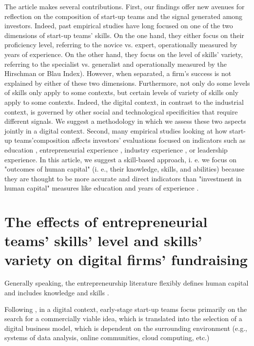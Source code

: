 \documentclass[12pt]{article}
\begin{document}
The article makes several contributions. First, our findings offer new avenues for reflection on the composition of start-up teams and the signal generated among investors. Indeed, past empirical studies have long focused on one of the two dimensions of start-up teams' skills. On the one hand, they either focus on their proficiency level, referring to the novice vs. expert, operationally measured by years of experience. On the other hand, they focus on the level of skills' variety, referring to the specialist vs. generalist and operationally measured by the Hirschman or Blau Index). However, when separated, a firm's success is not explained by either of these two dimensions. Furthermore, not only do some levels of skills only apply to some contexts, but certain levels of variety of skills only apply to some contexts. Indeed, the digital context, in contrast to the industrial context, is governed by other social and technological specificities that require different signals. We suggest a methodology in which we assess these two aspects jointly in a digital context. Second, many empirical studies looking at how start-up teams'composition affects investors' evaluations focused on indicators such as education \citep{franke2008venture}, entrepreneurial experience \citep{beckman2007early}, industry experience \citep{becker2015new}, or leadership experience\citep{hoenig2015quality}. In this article, we suggest a skill-based approach, i. e. we focus on "outcomes of human capital" (i. e., their knowledge, skills, and abilities) because they are thought to be more accurate and direct indicators than "investment in human capital" measures like education and years of experience \citep{unger2011human, marvel2016human}.

\section{The effects of entrepreneurial teams' skills' level and skills' variety on digital firms' fundraising}

Generally speaking, the entrepreneurship literature flexibly defines human capital and includes knowledge and skills \citep{ngoasong2017digital, marvel2016human}.

Following \citet{nambisan2017digital}, in a digital context, early-stage start-up teams focus primarily on the search for a commercially viable idea, which is translated into the selection of a digital business model, which is dependent on the surrounding environment (e.g., systems of data analysis, online communities, cloud computing, etc.)
\end{document}
